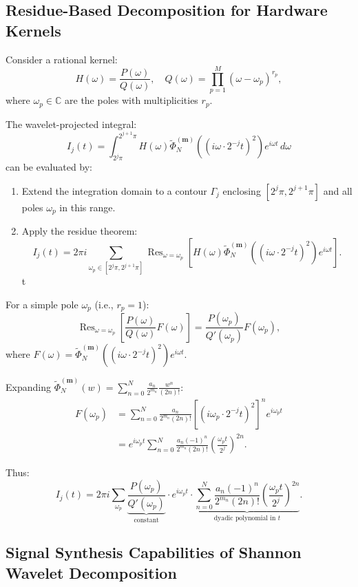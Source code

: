 \subsection{Residue-Based Decomposition for Hardware Kernels}

Consider a rational kernel:
\[
H(\omega) = \frac{P(\omega)}{Q(\omega)}, \quad Q(\omega) = \prod_{p=1}^{M} (\omega - \omega_p)^{r_p},
\]
where $\omega_p \in \mathbb{C}$ are the poles with multiplicities $r_p$.

The wavelet-projected integral:
\[
I_j(t) = \int_{2^j\pi}^{2^{j+1}\pi} H(\omega) \widetilde{\Phi}_N^{(\mathbf{m})}((i\omega \cdot 2^{-j}t)^2) e^{i\omega t} \, d\omega
\]
can be evaluated by:
\begin{enumerate}
\item Extend the integration domain to a contour $\Gamma_j$ enclosing $[2^j\pi, 2^{j+1}\pi]$ and all poles $\omega_p$ in this range.
\item Apply the residue theorem:
\[
I_j(t) = 2\pi i \sum_{\omega_p \in [2^j\pi, 2^{j+1}\pi]} \operatorname{Res}_{\omega=\omega_p} \left[H(\omega) \widetilde{\Phi}_N^{(\mathbf{m})}((i\omega \cdot 2^{-j}t)^2) e^{i\omega t}\right].
\]t
\end{enumerate}

For a simple pole $\omega_p$ (i.e., $r_p = 1$):
\[
\operatorname{Res}_{\omega=\omega_p} \left[\frac{P(\omega)}{Q(\omega)} F(\omega)\right] = \frac{P(\omega_p)}{Q'(\omega_p)} F(\omega_p),
\]
where $F(\omega) = \widetilde{\Phi}_N^{(\mathbf{m})}((i\omega \cdot 2^{-j}t)^2) e^{i\omega t}$.

Expanding $\widetilde{\Phi}_N^{(\mathbf{m})}(w) = \sum_{n=0}^{N} \frac{a_n}{2^{m_n}} \frac{w^n}{(2n)!}$:
\begin{align*}
F(\omega_p) &= \sum_{n=0}^{N} \frac{a_n}{2^{m_n} (2n)!} \left[(i\omega_p \cdot 2^{-j}t)^2\right]^n e^{i\omega_p t} \\
&= e^{i\omega_p t} \sum_{n=0}^{N} \frac{a_n (-1)^n}{2^{m_n} (2n)!} \left(\frac{\omega_p t}{2^j}\right)^{2n}.
\end{align*}

Thus:
\[
I_j(t) = 2\pi i \sum_{\omega_p} \underbrace{\frac{P(\omega_p)}{Q'(\omega_p)}}_{\text{constant}} \cdot e^{i\omega_p t} \cdot \underbrace{\sum_{n=0}^{N} \frac{a_n (-1)^n}{2^{m_n} (2n)!} \left(\frac{\omega_p t}{2^j}\right)^{2n}}_{\text{dyadic polynomial in } t}.
\]

\subsection{Signal Synthesis Capabilities of Shannon Wavelet Decomposition}


